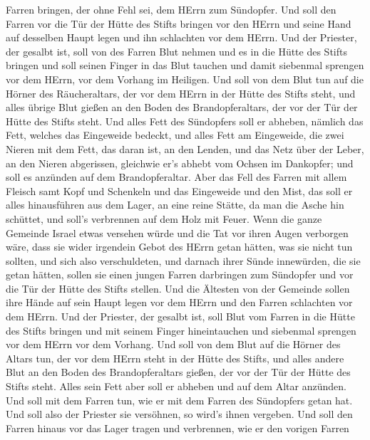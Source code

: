 Farren bringen, der ohne Fehl sei, dem HErrn zum Sündopfer. 
Und soll den Farren vor die Tür der Hütte des Stifts bringen vor den
HErrn und seine Hand auf desselben Haupt legen und ihn schlachten vor
dem HErrn.  Und der Priester, der gesalbt ist, soll von des
Farren Blut nehmen und es in die Hütte des Stifts bringen 
und soll seinen Finger in das Blut tauchen und damit siebenmal sprengen
vor dem HErrn, vor dem Vorhang im Heiligen.  Und soll von
dem Blut tun auf die Hörner des Räucheraltars, der vor dem HErrn in der
Hütte des Stifts steht, und alles übrige Blut gießen an den Boden des
Brandopferaltars, der vor der Tür der Hütte des Stifts steht.
 Und alles Fett des Sündopfers soll er abheben, nämlich das
Fett, welches das Eingeweide bedeckt, und alles Fett am Eingeweide,
 die zwei Nieren mit dem Fett, das daran ist, an den Lenden,
und das Netz über der Leber, an den Nieren abgerissen, 
gleichwie er's abhebt vom Ochsen im Dankopfer; und soll es anzünden auf
dem Brandopferaltar.  Aber das Fell des Farren mit allem
Fleisch samt Kopf und Schenkeln und das Eingeweide und den Mist,
 das soll er alles hinausführen aus dem Lager, an eine
reine Stätte, da man die Asche hin schüttet, und soll's verbrennen auf
dem Holz mit Feuer.  Wenn die ganze Gemeinde Israel etwas
versehen würde und die Tat vor ihren Augen verborgen wäre, dass sie
wider irgendein Gebot des HErrn getan hätten, was sie nicht tun sollten,
und sich also verschuldeten,  und darnach ihrer Sünde
innewürden, die sie getan hätten, sollen sie einen jungen Farren
darbringen zum Sündopfer und vor die Tür der Hütte des Stifts stellen.
 Und die Ältesten von der Gemeinde sollen ihre Hände auf
sein Haupt legen vor dem HErrn und den Farren schlachten vor dem HErrn.
 Und der Priester, der gesalbt ist, soll Blut vom Farren in
die Hütte des Stifts bringen  und mit seinem Finger
hineintauchen und siebenmal sprengen vor dem HErrn vor dem Vorhang.
 Und soll von dem Blut auf die Hörner des Altars tun, der
vor dem HErrn steht in der Hütte des Stifts, und alles andere Blut an
den Boden des Brandopferaltars gießen, der vor der Tür der Hütte des
Stifts steht.  Alles sein Fett aber soll er abheben und auf
dem Altar anzünden.  Und soll mit dem Farren tun, wie er
mit dem Farren des Sündopfers getan hat. Und soll also der Priester sie
versöhnen, so wird's ihnen vergeben.  Und soll den Farren
hinaus vor das Lager tragen und verbrennen, wie er den vorigen Farren
